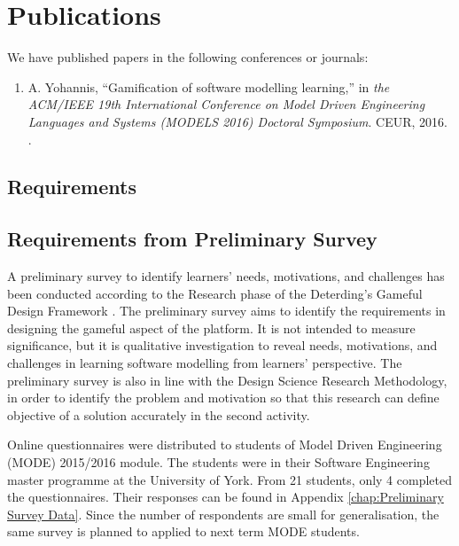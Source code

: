\documentclass[12pt, a4paper]{report} \usepackage[titletoc]{appendix}
\begin{document}
\chapter{Publications}
\label{Publications}
We have published papers in the following conferences or journals: 
\begin{enumerate}
 \item A. Yohannis, ``Gamification of software modelling learning,'' in
 \textit{the ACM/IEEE 19th International Conference on Model Driven Engineering Languages and Systems (MODELS 2016) Doctoral Symposium}. CEUR, 2016. \cite{Yohannis2016}.
\end{enumerate}

\begin{appendices}

\chapter{Requirements}
\label{Requirements}

\section{Requirements from Preliminary Survey}
\label{Requirements from Preliminary Survey}
A preliminary survey to identify learners' needs, motivations, and challenges has been conducted according to the Research phase of the Deterding's Gameful Design Framework \cite{deterding2015lens}. The preliminary survey aims to identify the requirements in designing the gameful aspect of the platform. It is not intended to measure significance, but it is qualitative investigation to reveal needs, motivations, and challenges in learning software modelling from learners' perspective. The preliminary survey is also in line with the Design Science Research Methodology, in order to identify the problem and motivation so that this research can define objective of a solution accurately in the second activity. 

Online questionnaires were distributed to students of Model Driven Engineering (MODE) 2015/2016 module. The students were in their Software Engineering master programme at the University of York. From 21 students, only 4 completed the questionnaires. Their responses can be found in Appendix \autoref{chap:Preliminary Survey Data}. Since the number of respondents are small for generalisation, the same survey is planned to applied to next term MODE students.


\end{appendices}
\end{document}
